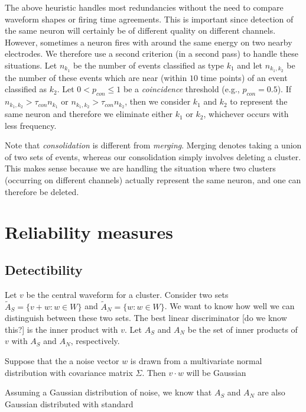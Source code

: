 \documentclass{article}
\begin{document}
The above heuristic handles most redundancies without the need to compare waveform shapes or firing time agreements. This is important since detection of the same neuron will certainly be of different quality on different channels. However, sometimes a neuron fires with around the same energy on two nearby electrodes. We therefore use a second criterion (in a second pass) to handle these situations. Let $n_{k_1}$ be the number of events classified as type $k_1$ and let $n_{k_1,k_2}$ be the number of these events which are near (within $10$ time points) of an event classified as $k_2$. Let $0<p_{con}\leq 1$ be a \emph{coincidence} threshold (e.g., $p_{con}=0.5$). If $n_{k_1,k_2}>\tau_{con} n_{k_1}$ or $n_{k_1,k_2}>\tau_{con} n_{k_2}$, then we consider $k_1$ and $k_2$ to represent the same neuron and therefore we eliminate either $k_1$ or $k_2$, whichever occurs with less frequency.

Note that \emph{consolidation} is different from \emph{merging}. Merging denotes taking a union of two sets of events, whereas our consolidation simply involves deleting a cluster. This makes sense because we are handling the situation where two clusters (occurring on different channels) actually represent the same neuron, and one can therefore be deleted.

\section{Reliability measures}

\subsection{Detectibility}

Let $v$ be the central waveform for a cluster. Consider two sets $\tilde{A}_S=\{v+w:w\in W\}$ and $\tilde{A}_N=\{w:w\in W\}$. We want to know how well we can distinguish between these two sets. The best linear discriminator [do we know this?] is the inner product with $v$. Let $A_S$ and $A_N$ be the set of inner products of $v$ with $A_S$ and $A_N$, respectively.

Suppose that the a noise vector $w$ is drawn from a multivariate normal distribution with covariance matrix $\Sigma$. Then $v\cdot w$ will be Gaussian

Assuming a Gaussian distribution of noise, we know that $A_S$ and $A_N$ are also Gaussian distributed with standard
\end{document}
